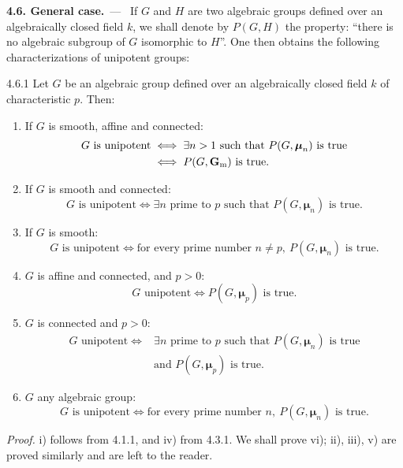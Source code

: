 \par\medskip\noindent\textbf{4.6. General case.}\ ---\ \label{XVII.4.6}
If $G$ and $H$ are two algebraic groups defined over an algebraically closed field $k$, we shall denote by $P(G,H)$ the property: ``there is no algebraic subgroup of $G$ isomorphic to $H$''. One then obtains the following characterizations of unipotent groups:
\begin{theorem}{4.6.1}\label{XVII.4.6.1}
Let $G$ be an algebraic group defined over an algebraically closed field $k$ of characteristic $p$. Then:
\begin{enumerate}[label=\textup{\roman*)}]
\item If $G$ is smooth, affine and connected:
\[
\begin{aligned}
 G\text{ is unipotent}&\iff\exists n>1\text{ such that }P(G,\boldsymbol\mu_n)\text{ is true}\\
 &\iff P(G,\mathbf{G}_{\mathrm{m}})\text{ is true}.
\end{aligned}
\]
\item If $G$ is smooth and connected:
\[
 G\text{ is unipotent}\iff\exists n\text{ prime to }p\text{ such that }P(G,\boldsymbol\mu_n)\text{ is true}.
\]
\item If $G$ is smooth:
\[
 G\text{ is unipotent}\iff\text{for every prime number }n\neq p,\ P(G,\boldsymbol\mu_n)\text{ is true}.
\]
\item $G$ is affine and connected, and $p>0$:
\[
 G\text{ unipotent}\iff P(G,\boldsymbol\mu_p)\text{ is true}.
\]
\item $G$ is connected and $p>0$:
\[
\begin{aligned}
 G\text{ unipotent}\iff&\exists n\text{ prime to }p\text{ such that }P(G,\boldsymbol\mu_n)\text{ is true}\\
 &\text{and }P(G,\boldsymbol\mu_p)\text{ is true}.
\end{aligned}
\]
\item $G$ any algebraic group:
\[
 G\text{ is unipotent}\iff\text{for every prime number }n,\ P(G,\boldsymbol\mu_n)\text{ is true}.
\]
\end{enumerate}
\end{theorem}
\noindent\emph{Proof.} i) follows from 4.1.1, and iv) from 4.3.1. We shall prove vi); ii), iii), v) are proved similarly and are left to the reader.

